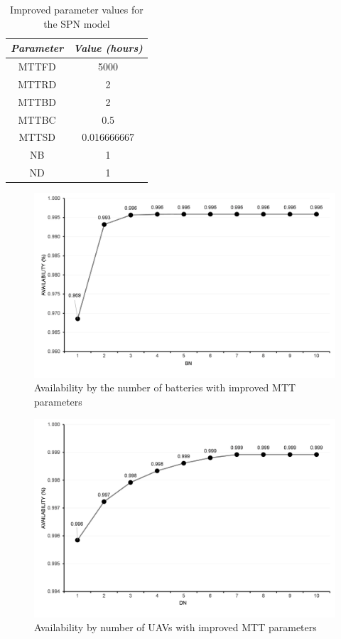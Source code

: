\documentclass[conference]{IEEEtran}
\begin{document}
\begin{table}[htbp]
\caption{Improved parameter values for the SPN model}
\begin{center}
\begin{tabular}{|c|c|}
\hline
\textbf{\textit{Parameter}} & \textbf{\textit{Value (hours)}} \\
\hline
  MTTFD & 5000\\
 MTTRD & 2\\
 MTTBD & 2 \\ 
 MTTBC & 0.5 \\
 MTTSD & 0.016666667 \\
 NB & 1 \\
 ND & 1 \\
\hline
\end{tabular}
\label{tab:spn_parameter_values}
\end{center}
\end{table}

\begin{figure}[htbp]
\centerline{\includegraphics[scale=0.4]{img/exps/SA_005.png}}
\caption{Availability by the number of batteries with improved MTT parameters}
\label{fig:spn_sa_battery}
\end{figure}


\begin{figure}[htbp]
\centerline{\includegraphics[scale=0.4]{img/exps/SA_004.png}}
\caption{Availability by number of UAVs with improved MTT parameters}
\label{fig:spn_sa_uav}
\end{figure}
\end{document}
